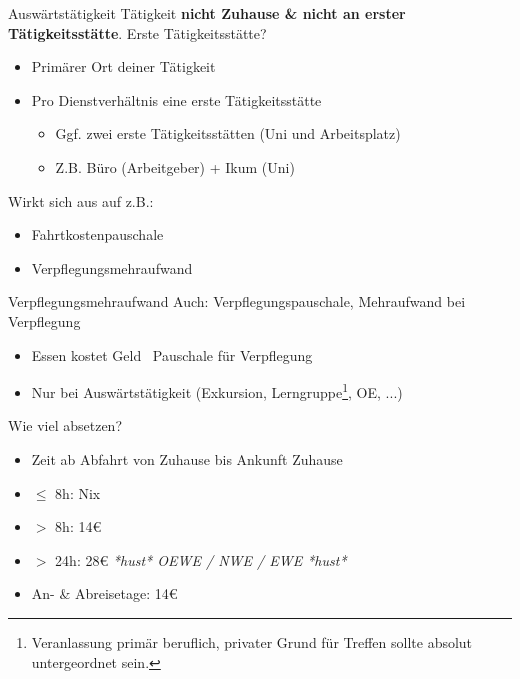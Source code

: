 \documentclass{beamer}
\begin{document}
			\begin{frame}{Auswärtstätigkeit}
				Tätigkeit \textbf{nicht Zuhause \& nicht an erster Tätigkeitsstätte}.\n
				Erste Tätigkeitsstätte?
				\begin{itemize}
					\item Primärer Ort deiner Tätigkeit
					\item Pro Dienstverhältnis eine erste Tätigkeitsstätte
					\begin{itemize}
						\item Ggf. zwei erste Tätigkeitsstätten (Uni und Arbeitsplatz)
						\item Z.B. Büro (Arbeitgeber) + Ikum (Uni)
					\end{itemize}
				\end{itemize}\n\pause
				Wirkt sich aus auf z.B.:
				\begin{itemize}
					\item Fahrtkostenpauschale
					\item Verpflegungsmehraufwand
				\end{itemize}
			\end{frame}
		
			\begin{frame}[label={verpflegungsmehraufwand}]{Verpflegungsmehraufwand}
				Auch: Verpflegungspauschale, Mehraufwand bei Verpflegung
				\begin{itemize}
					\item Essen kostet Geld \textrightarrow\ Pauschale für Verpflegung
					\item Nur bei Auswärtstätigkeit (Exkursion, Lerngruppe\footnote{Veranlassung primär beruflich, privater Grund für Treffen sollte absolut untergeordnet sein.}, OE, ...)
				\end{itemize}\n\pause
				Wie viel absetzen?
				\begin{itemize}
					\item Zeit ab Abfahrt von Zuhause bis Ankunft Zuhause
					\item $\leq$ 8h: Nix
					\item $>$ 8h: 14€
					\item $>$ 24h: 28€ {\tiny \textit{*hust* OEWE / NWE / EWE *hust*}}
					\item An- \& Abreisetage: 14€
				\end{itemize}
			\end{frame}
		
\end{document}
